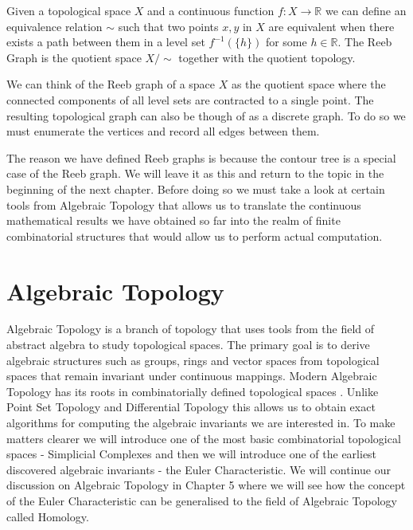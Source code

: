 \begin{defn}
Given a topological space $X$ and a continuous function $f: X \to \mathbb{R}$ we can define an equivalence relation $\sim$ such that two points $x, y$ in $X$ are equivalent when there exists a path between them in a level set $f^{-1}(\{h\})$ for some $h \in \mathbb{R}$. The Reeb Graph is the quotient space $X \big/ \sim$ together with the quotient topology.
\end{defn}

We can think of the Reeb graph of a space $X$ as the quotient space where the connected components of all level sets are contracted to a single point. The resulting topological graph can also be though of as a discrete graph. To do so we must enumerate the vertices and record all edges between them.

The reason we have defined Reeb graphs is because the contour tree is a special case of the Reeb graph. We will leave it as this and return to the topic in the beginning of the next chapter. Before doing so we must take a look at certain tools from Algebraic Topology that allows us to translate the continuous mathematical results we have obtained so far into the realm of finite combinatorial structures that would allow us to perform actual computation.

\section{Algebraic Topology}

Algebraic Topology is a branch of topology that uses tools from the field of abstract algebra to study topological spaces. The primary goal is to derive algebraic structures such as groups, rings and vector spaces from topological spaces that remain invariant under continuous mappings. Modern Algebraic Topology has its roots in combinatorially defined topological spaces \cite{combinatorial-algebraic-topology}. Unlike Point Set Topology and Differential Topology this allows us to obtain exact algorithms for computing the algebraic invariants we are interested in. To make matters clearer we will introduce one of the most basic combinatorial topological spaces - Simplicial Complexes and then we will introduce one of the earliest discovered algebraic invariants - the Euler Characteristic. We will continue our discussion on Algebraic Topology in Chapter 5 where we will see how the concept of the Euler Characteristic can be generalised to the field of Algebraic Topology called Homology.

